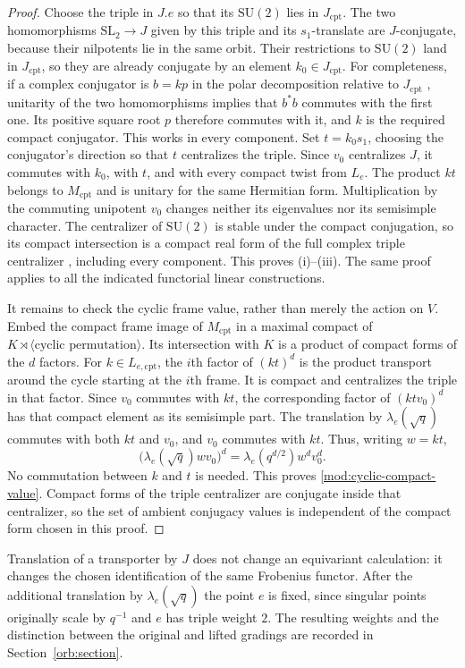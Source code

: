 \begin{proof}
Choose the triple in $J.e$ so that its $\mathrm{SU}(2)$ lies in
$J_{\mathrm{cpt}}$. The two homomorphisms $\mathrm{SL}_2\to J$
given by this triple and its $s_1$-translate are $J$-conjugate,
because their nilpotents lie in the same orbit. Their restrictions
to $\mathrm{SU}(2)$ land in $J_{\mathrm{cpt}}$, so they are
already conjugate by an element $k_0\in J_{\mathrm{cpt}}$.
For completeness, if a complex conjugator is $b=kp$ in the polar
decomposition relative to $J_{\mathrm{cpt}}$
\cite[Lemma~3.5]{AdamsTaibi}, unitarity of the two
homomorphisms implies that $b^*b$ commutes with the first one. Its
positive square root $p$ therefore commutes with it, and $k$ is
the required compact conjugator. This works in every component.
Set $t=k_0s_1$, choosing the conjugator's direction so that $t$
centralizes the triple. Since $v_0$ centralizes $J$, it commutes
with $k_0$, with $t$, and with every compact twist from $L_e$.
The product $kt$ belongs to $M_{\mathrm{cpt}}$ and is unitary for
the same Hermitian form. Multiplication by the commuting unipotent
$v_0$ changes neither its eigenvalues nor its semisimple
character. The centralizer of $\mathrm{SU}(2)$ is stable under
the compact conjugation, so its compact intersection is a compact
real form of the full complex triple centralizer
\cite[Lemma~3.10]{AdamsTaibi}, including every component. This
proves \textup{(i)}--\textup{(iii)}. The same proof
applies to all the indicated functorial linear constructions.

It remains to check the cyclic frame value, rather than merely the
action on $V$. Embed the compact frame image of
$M_{\mathrm{cpt}}$ in a maximal compact of
$K\rtimes\langle\text{cyclic permutation}\rangle$. Its
intersection with $K$ is a product of compact forms of the $d$
factors. For $k\in L_{e,\mathrm{cpt}}$, the $i$th factor of
$(kt)^d$ is the product transport around the cycle starting at the
$i$th frame. It is compact and centralizes the triple in that
factor. Since $v_0$ commutes with $kt$, the corresponding factor
of $(ktv_0)^d$ has that compact element as its semisimple part.
The translation by $\lambda_e(\sqrt q)$ commutes with both
$kt$ and $v_0$, and $v_0$ commutes with $kt$. Thus, writing $w=kt$,
\[
 \bigl(\lambda_e(\sqrt q)wv_0\bigr)^d
   =\lambda_e(q^{d/2})w^dv_0^d.
\]
No commutation between $k$ and $t$ is needed. This proves
\eqref{mod:cyclic-compact-value}. Compact forms of the triple
centralizer are conjugate inside that centralizer, so the set of
ambient conjugacy values is independent of the compact form
chosen in this proof.
\end{proof}

Translation of a transporter by $J$ does not change an equivariant
calculation: it changes the chosen identification of the same
Frobenius functor. After the additional translation by
$\lambda_e(\sqrt q)$ the point $e$ is fixed, since singular
points originally scale by $q^{-1}$ and $e$ has triple weight $2$.
The resulting weights and the distinction between the original and
lifted gradings are recorded in Section~\ref{orb:section}.
